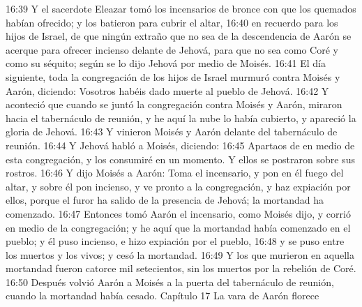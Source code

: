 16:39 Y el sacerdote Eleazar tomó los incensarios de bronce con que los quemados habían ofrecido; y los batieron para cubrir el altar,  
16:40 en recuerdo para los hijos de Israel, de que ningún extraño que no sea de la descendencia de Aarón se acerque para ofrecer incienso delante de Jehová, para que no sea como Coré y como su séquito; según se lo dijo Jehová por medio de Moisés.  
16:41 El día siguiente, toda la congregación de los hijos de Israel murmuró contra Moisés y Aarón, diciendo: Vosotros habéis dado muerte al pueblo de Jehová.  
16:42 Y aconteció que cuando se juntó la congregación contra Moisés y Aarón, miraron hacia el tabernáculo de reunión, y he aquí la nube lo había cubierto, y apareció la gloria de Jehová.  
16:43 Y vinieron Moisés y Aarón delante del tabernáculo de reunión.  
16:44 Y Jehová habló a Moisés, diciendo:  
16:45 Apartaos de en medio de esta congregación, y los consumiré en un momento. Y ellos se postraron sobre sus rostros.  
16:46 Y dijo Moisés a Aarón: Toma el incensario, y pon en él fuego del altar, y sobre él pon incienso, y ve pronto a la congregación, y haz expiación por ellos, porque el furor ha salido de la presencia de Jehová; la mortandad ha comenzado.  
16:47 Entonces tomó Aarón el incensario, como Moisés dijo, y corrió en medio de la congregación; y he aquí que la mortandad había comenzado en el pueblo; y él puso incienso, e hizo expiación por el pueblo,  
16:48 y se puso entre los muertos y los vivos; y cesó la mortandad.  
16:49 Y los que murieron en aquella mortandad fueron catorce mil setecientos, sin los muertos por la rebelión de Coré.  
16:50 Después volvió Aarón a Moisés a la puerta del tabernáculo de reunión, cuando la mortandad había cesado.  
Capítulo 17
La vara de Aarón florece  

